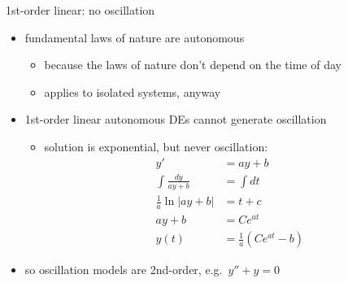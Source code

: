 \documentclass{beamer}
\begin{document}
\begin{frame}{1st-order linear: no oscillation}

\begin{itemize}
\item fundamental laws of nature are autonomous
    \begin{itemize}
    \item because the laws of nature don't depend on the time of day
    \item applies to isolated systems, anyway
    \end{itemize}
\item 1st-order linear autonomous DEs cannot generate oscillation
    \begin{itemize}
    \item solution is exponential, but never oscillation: \small
\begin{align*}
y' &= a y + b \\
\int \frac{dy}{ay+b} &= \int dt \\
\frac{1}{a} \ln|ay+b| &= t+c \\
a y + b &= C e^{at} \\
y(t) &= \frac{1}{a}\left(C e^{at} - b\right)
\end{align*}
    \end{itemize}
\item so oscillation models are 2nd-order, e.g.~$y'' + y = 0$
\end{itemize}
\end{frame}
\end{document}
